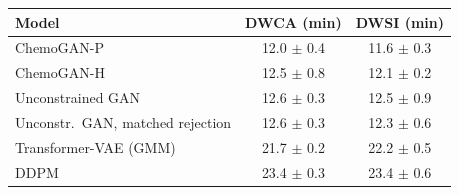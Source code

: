 \begin{tabular}{lcc}
\hline
\textbf{Model} & \textbf{DWCA (min)} & \textbf{DWSI (min)} \\ \hline
ChemoGAN-P & 12.0 $\pm$ 0.4 & 11.6 $\pm$ 0.3 \\
ChemoGAN-H & 12.5 $\pm$ 0.8 & 12.1 $\pm$ 0.2 \\
Unconstrained GAN & 12.6 $\pm$ 0.3 & 12.5 $\pm$ 0.9 \\
Unconstr.\ GAN, matched rejection & 12.6 $\pm$ 0.3 & 12.3 $\pm$ 0.6 \\
Transformer-VAE (GMM) & 21.7 $\pm$ 0.2 & 22.2 $\pm$ 0.5 \\
DDPM & 23.4 $\pm$ 0.3 & 23.4 $\pm$ 0.6 \\
\hline
\end{tabular}
